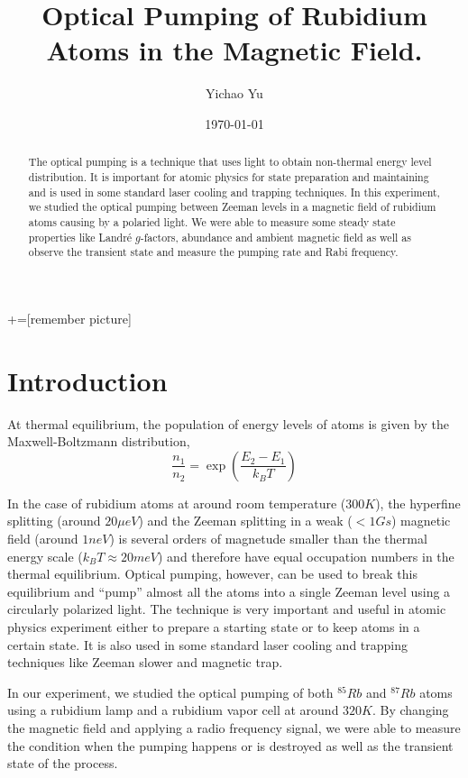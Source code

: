 \documentclass[aps,twocolumn,secnumarabic,balancelastpage,amsmath,amssymb,nofootinbib]{revtex4}
\newcommand{\paren}[1]{{\left({#1}\right)}}
\begin{document}
+=[remember picture]
\title{Optical Pumping of Rubidium Atoms in the Magnetic Field.}
\author{Yichao Yu}
\date{\today}

\begin{abstract}
  The optical pumping is a technique that uses light to obtain non-thermal energy level distribution. It is important for atomic physics for state preparation and maintaining and is used in some standard laser cooling and trapping techniques. In this experiment, we studied the optical pumping between Zeeman levels in a magnetic field of rubidium atoms causing by a polaried light. We were able to measure some steady state properties like Landr\'e $g$-factors, abundance and ambient magnetic field as well as observe the transient state and measure the pumping rate and Rabi frequency.
\end{abstract}

\maketitle
\section*{Introduction}
At thermal equilibrium, the population of energy levels of atoms is given by the Maxwell-Boltzmann distribution,
\[ \frac{n_1}{n_2}=\exp\paren{\frac{E_2-E_1}{k_BT}} \]

In the case of rubidium atoms at around room temperature ($300K$), the hyperfine splitting (around $20\mu eV$) and the Zeeman splitting in a weak ($<1Gs$) magnetic field (around $1neV$) is several orders of magnetude smaller than the thermal energy scale ($k_BT\approx20meV$) and therefore have equal occupation numbers in the thermal equilibrium. Optical pumping, however, can be used to break this equilibrium and ``pump'' almost all the atoms into a single Zeeman level using a circularly polarized light. The technique is very important and useful in atomic physics experiment either to prepare a starting state or to keep atoms in a certain state. It is also used in some standard laser cooling and trapping techniques like Zeeman slower and magnetic trap.

In our experiment, we studied the optical pumping of both ${}^{85}Rb$ and ${}^{87}Rb$ atoms using a rubidium lamp and a rubidium vapor cell at around $320K$. By changing the magnetic field and applying a radio frequency signal, we were able to measure the condition when the pumping happens or is destroyed as well as the transient state of the process.
\end{document}
